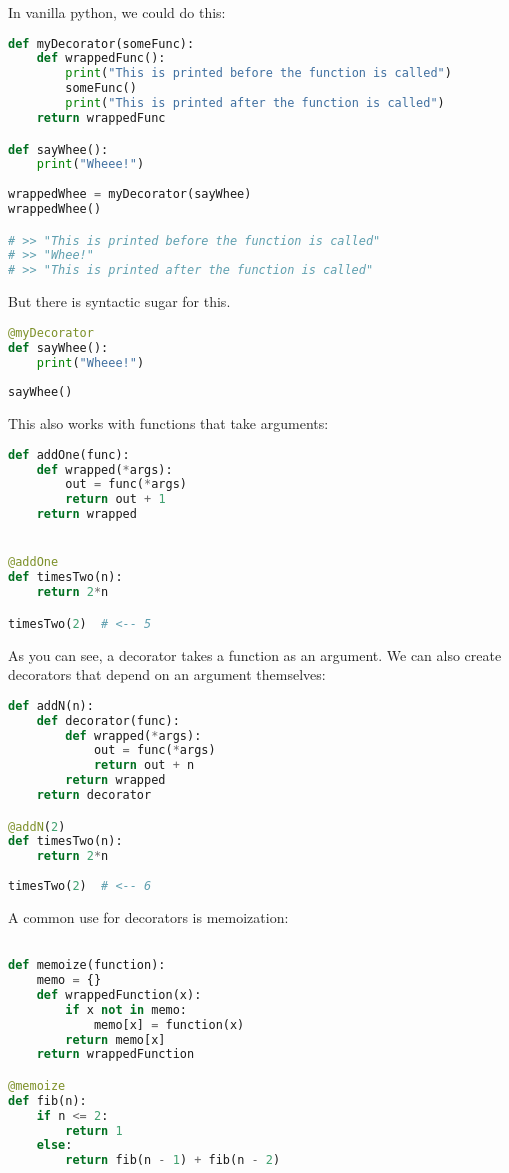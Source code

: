 In vanilla python, we could do this: 

\begin{lstlisting}[language=python]
def myDecorator(someFunc):
    def wrappedFunc():
        print("This is printed before the function is called")
        someFunc()
        print("This is printed after the function is called")
    return wrappedFunc

def sayWhee():
    print("Wheee!")
    
wrappedWhee = myDecorator(sayWhee)
wrappedWhee()

# >> "This is printed before the function is called"
# >> "Whee!"
# >> "This is printed after the function is called"
\end{lstlisting}


But there is syntactic sugar for this. 
\begin{lstlisting}[language=python]
@myDecorator
def sayWhee():
    print("Wheee!")
    
sayWhee()
\end{lstlisting}

This also works with functions that take arguments: 

\begin{lstlisting}[language=python]
def addOne(func):
    def wrapped(*args):
        out = func(*args)
        return out + 1
    return wrapped


@addOne
def timesTwo(n):
    return 2*n

timesTwo(2)  # <-- 5
\end{lstlisting}

As you can see, a decorator takes a function as an argument. We can also create decorators that depend on an argument themselves: 

\begin{lstlisting}[language=python]
def addN(n):
    def decorator(func):    
        def wrapped(*args):
            out = func(*args)
            return out + n
        return wrapped
    return decorator

@addN(2)
def timesTwo(n):
    return 2*n
    
timesTwo(2)  # <-- 6
\end{lstlisting}

A common use for decorators is memoization:
\begin{lstlisting}[language=python]

def memoize(function):
    memo = {}
    def wrappedFunction(x):
        if x not in memo:            
            memo[x] = function(x)
        return memo[x]
    return wrappedFunction

@memoize
def fib(n):
    if n <= 2:
        return 1
    else:
        return fib(n - 1) + fib(n - 2)
\end{lstlisting}


